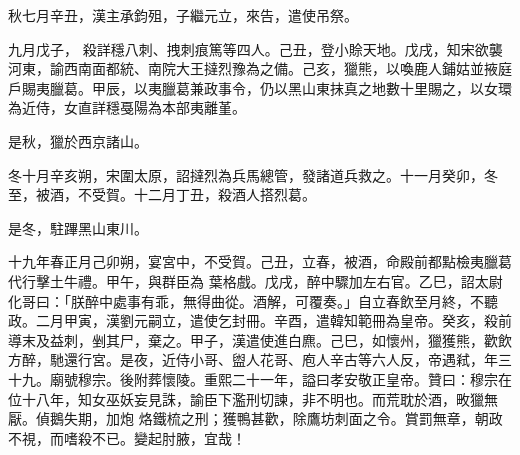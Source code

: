 \begin{pinyinscope}
 秋七月辛丑，漢主承鈞殂，子繼元立，來告，遣使吊祭。



 九月戊子，
 殺詳穩八刺、拽刺痕篤等四人。己丑，登小賒天地。戊戌，知宋欲襲河東，諭西南面都統、南院大王撻烈豫為之備。己亥，獵熊，以喚鹿人鋪姑並掖庭戶賜夷臘葛。甲辰，以夷臘葛兼政事令，仍以黑山東抹真之地數十里賜之，以女環為近侍，女直詳穩戞陽為本部夷離堇。



 是秋，獵於西京諸山。



 冬十月辛亥朔，宋圍太原，詔撻烈為兵馬總管，發諸道兵救之。十一月癸卯，冬至，被酒，不受賀。十二月丁丑，殺酒人搭烈葛。



 是冬，駐蹕黑山東川。



 十九年春正月己卯朔，宴宮中，不受賀。己丑，立春，被酒，命殿前都點檢夷臘葛代行擊土牛禮。甲午，與群臣為
 葉格戲。戊戌，醉中驟加左右官。乙巳，詔太尉化哥曰：「朕醉中處事有乖，無得曲從。酒解，可覆奏。」自立春飲至月終，不聽政。二月甲寅，漢劉元嗣立，遣使乞封冊。辛酉，遣韓知範冊為皇帝。癸亥，殺前導末及益刺，剉其尸，棄之。甲子，漢遣使進白麃。己巳，如懷州，獵獲熊，歡飲方醉，馳還行宮。是夜，近侍小哥、盥人花哥、庖人辛古等六人反，帝遇弒，年三十九。廟號穆宗。後附葬懷陵。重熙二十一年，謚曰孝安敬正皇帝。贊曰：穆宗在位十八年，知女巫妖妄見誅，諭臣下濫刑切諫，非不明也。而荒耽於酒，畋獵無厭。偵鵝失期，加炮
 烙鐵梳之刑；獲鴨甚歡，除鷹坊刺面之令。賞罰無章，朝政不視，而嗜殺不已。變起肘腋，宜哉！



\end{pinyinscope}